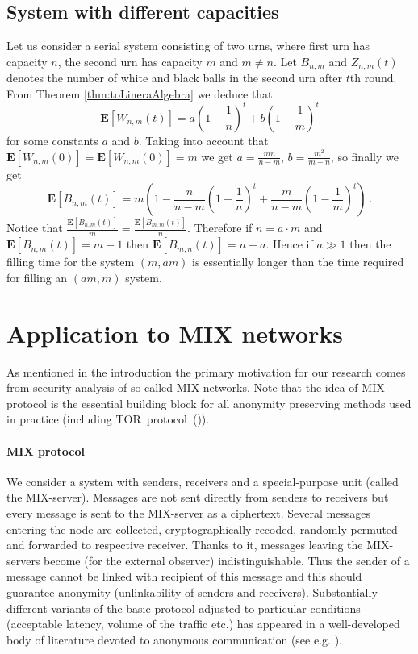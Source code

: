 \documentclass[submission]{dmtcs}
\newcommand{\E}[1]{\mathbf{E}\left[#1\right]}
\begin{document}
\subsection{System with different capacities}
\label{sec:differentSerial}
Let us consider a serial system consisting of two urns, where first urn has 
capacity $n$, the second urn has capacity $m$ and $m\neq n$.
Let $B_{n,m}$ and  $Z_{n,m}(t)$ denotes the number of white and black balls 
in the second urn after  $t$th round. 
From Theorem \ref{thm:toLineraAlgebra} we deduce that
$$ 
\E{W_{n,m}(t)} = a\left(1-\frac1n\right)^t + b\left(1-\frac1m\right)^t
$$
for some constants $a$ and $b$. Taking into account that 
$\E{W_{n,m}(0)} = \E{W_{n,m}(0)} = m$ we get
$a = \frac{m n}{n-m}$, $b = \frac{m^2}{m-n}$, so finally we get
$$
  \E{B_{n,m}(t)} = 
	m\left(1 - 
	\frac{n}{n-m}\left(1-\frac{1}{n}\right)^t +
	\frac{m}{n-m}\left(1-\frac{1}{m}\right)^t
	\right)~.
$$
Notice that $\frac{\E{B_{n,m}(t)}}{m} = \frac{\E{B_{m,m}(t)}}{n}$.
Therefore if $n = a\cdot m$ and $\E{B_{n,m}(t)} = m-1$ then
$\E{B_{m,n}(t)} = n-a$. Hence if $a \gg 1$ then the filling time for the system 
$(m,am)$ is essentially longer than the time required for filling 
an $(am,m)$ system.

\section{Application to MIX networks}
\label{MIX}

As mentioned in the introduction the primary motivation for our research comes from  security analysis of so-called MIX networks. 
Note that the idea of MIX protocol is the essential building block for all anonymity preserving methods used in practice (including TOR~protocol~(\cite{TOR04})). 


\paragraph{MIX protocol} We consider a system with senders, receivers and a special-purpose unit (called the MIX-server). Messages are not sent directly from senders to receivers but every message is sent to the MIX-server as a ciphertext. Several messages entering the node are collected,  cryptographically recoded, randomly permuted and forwarded to respective receiver. Thanks to it, messages leaving the MIX-servers become (for the external observer) indistinguishable. Thus the  sender of a message cannot be linked with recipient of this  message and this should guarantee anonymity (unlinkability of senders and receivers).  
Substantially different variants of the basic protocol adjusted to particular conditions (acceptable latency, volume of the traffic etc.)    has appeared in a well-developed body of literature devoted to anonymous communication (see e.g.  \cite{SUR}). 
\end{document}
